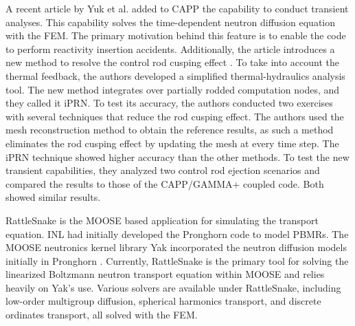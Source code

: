 A recent article by Yuk et al. \cite{yuk_time-dependent_2020} added to CAPP the capability to conduct transient analyses.
This capability solves the time-dependent neutron diffusion equation with the \gls{FEM}.
The primary motivation behind this feature is to enable the code to perform reactivity insertion accidents.
Additionally, the article introduces a new method to resolve the control rod cusping effect \cite{joo_resolution_1984}.
To take into account the thermal feedback, the authors developed a simplified thermal-hydraulics analysis tool.
The new method integrates over partially rodded computation nodes, and they called it iPRN.
To test its accuracy, the authors conducted two exercises with several techniques that reduce the rod cusping effect.
The authors used the mesh reconstruction method to obtain the reference results, as such a method eliminates the rod cusping effect by updating the mesh at every time step.
The iPRN technique showed higher accuracy than the other methods.
To test the new transient capabilities, they analyzed two control rod ejection scenarios and compared the results to those of the CAPP/GAMMA+ coupled code.
Both showed similar results.

RattleSnake \cite{wang_rattlesnake_2019} is the MOOSE \cite{gaston_moose_2009} based application for simulating the transport equation.
\gls{INL} had initially developed the Pronghorn code to model \glspl{PBMR}.
The MOOSE neutronics kernel library Yak incorporated the neutron diffusion models initially in Pronghorn \cite{strydom_inl_2013}.
Currently, RattleSnake is the primary tool for solving the linearized Boltzmann neutron transport equation within MOOSE and relies heavily on Yak's use.
Various solvers are available under RattleSnake, including low-order multigroup diffusion, spherical harmonics transport, and discrete ordinates transport, all solved with the \gls{FEM}.

